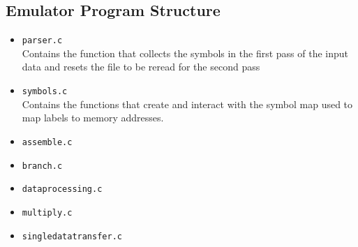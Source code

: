 \documentclass[8pt]{article}
\begin{document}
\begin{minipage}{0.45\textwidth}
\subsection{Emulator Program Structure}

\begin{itemize}
    \item \texttt{parser.c} \\Contains the function that collects the symbols in the first pass of the
    input data and resets the file to be reread for the second pass
    \item \texttt{symbols.c} \\Contains the functions that create and interact with the
    symbol map used to map labels to memory addresses.
    \item \texttt{assemble.c} \\
    \item \texttt{branch.c}
    \item \texttt{dataprocessing.c}
    \item \texttt{multiply.c}
    \item \texttt{singledatatransfer.c}
\end{itemize}
\end{minipage}%
\hfill
\end{document}
